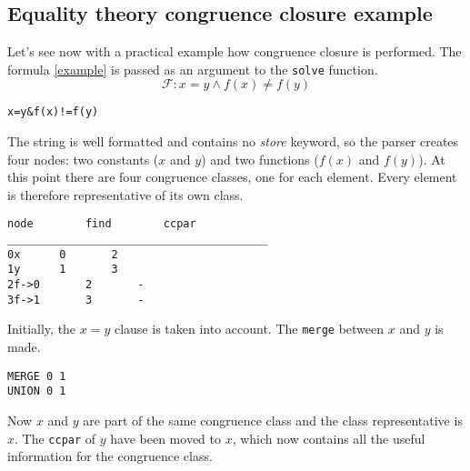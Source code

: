 \documentclass{IEEEtran}
\begin{document}
\subsection{Equality theory congruence closure example}
Let's see now with a practical example how congruence closure is performed.
The formula \ref{example} is passed as an argument to the \verb|solve| function. 
\begin{equation}
	\label{example}
	\mathcal{F} : x = y \land f(x) \ne f(y)
\end{equation}
\begin{lstlisting}
x=y&f(x)!=f(y)
\end{lstlisting}
The string is well formatted and contains no \textit{store} keyword, so the parser creates four nodes: two constants ($x$ and $y$) and two functions ($f(x)$ and $f(y)$). At this point there are four congruence classes, one for each element. Every element is therefore representative of its own class.
\begin {center}
\end{center}

\begin{lstlisting}
node		find		ccpar
________________________________________
0x		0		2
1y		1		3
2f->0		2		-
3f->1		3		-
\end{lstlisting}

Initially, the $x=y$ clause is taken into account. The \verb|merge| between $x$ and $y$ is made. 
\begin{lstlisting}
MERGE 0 1
UNION 0 1
\end{lstlisting}
Now $x$ and $y$ are part of the same congruence class and the class representative is $x$. The \verb|ccpar| of $y$ have been moved to $x$, which now contains all the useful information for the congruence class.
\begin {center}
\end{center}
\end{document}
